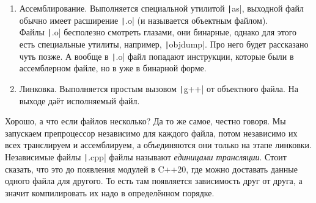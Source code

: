\documentclass{article}
\begin{document}
\begin{enumerate}
        \item Ассемблирование. Выполняется специальной утилитой \texttt|as|, выходной файл обычно имеет расширение \texttt|.o| (и называется объектным файлом).\\
        Файлы \texttt|.o| бесполезно смотреть глазами, они бинарные, однако для этого есть специальные утилиты, например, \texttt|objdump|. Про него будет рассказано чуть позже. А вообще в \texttt|.o| файл попадают инструкции, которые были в ассемблерном файле, но в уже в бинарной форме.
        \item Линковка. Выполняется простым вызовом \texttt|g++| от объектного файла. На выходе даёт исполняемый файл.
    \end{enumerate}
    Хорошо, а что если файлов несколько? Да то же самое, честно говоря. Мы запускаем препроцессор независимо для каждого файла, потом независимо их всех транслируем и ассемблируем, а объединяются они только на этапе линковки. Независимые файлы \texttt|.cpp| файлы называют \textit{единицами трансляции}. Стоит сказать, что это до появления модулей в C++20, где можно доставать данные одного файла для другого. То есть там появляется зависимость друг от друга, а значит компилировать их надо в определённом порядке.
\end{document}
